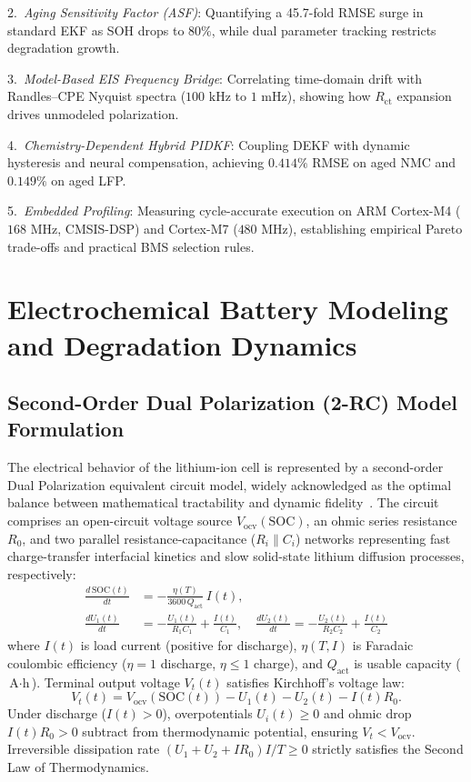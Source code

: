 \documentclass[preprint,12pt]{elsarticle}
\begin{document}
2.~\emph{Aging Sensitivity Factor (ASF)}: Quantifying a 45.7-fold RMSE surge in standard EKF as SOH drops to $80\%$, while dual parameter tracking restricts degradation growth.

3.~\emph{Model-Based EIS Frequency Bridge}: Correlating time-domain drift with Randles--CPE Nyquist spectra ($100\text{ kHz}$ to $1\text{ mHz}$), showing how $R_{\text{ct}}$ expansion drives unmodeled polarization.

4.~\emph{Chemistry-Dependent Hybrid PIDKF}: Coupling DEKF with dynamic hysteresis and neural compensation, achieving $0.414\%$ RMSE on aged NMC and $0.149\%$ on aged LFP.

5.~\emph{Embedded Profiling}: Measuring cycle-accurate execution on ARM Cortex-M4 ($168\text{ MHz}$, CMSIS-DSP) and Cortex-M7 ($480\text{ MHz}$), establishing empirical Pareto trade-offs and practical BMS selection rules.

\section{Electrochemical Battery Modeling and Degradation Dynamics}

\subsection{Second-Order Dual Polarization (2-RC) Model Formulation}
The electrical behavior of the lithium-ion cell is represented by a second-order Dual Polarization equivalent circuit model, widely acknowledged as the optimal balance between mathematical tractability and dynamic fidelity~\cite{Hu2012ecm,Xiong2014}. The circuit comprises an open-circuit voltage source $V_{\text{ocv}}(\text{SOC})$, an ohmic series resistance $R_0$, and two parallel resistance-capacitance ($R_i \parallel C_i$) networks representing fast charge-transfer interfacial kinetics and slow solid-state lithium diffusion processes, respectively:
\begin{align}
\frac{d\,\text{SOC}(t)}{dt} &= -\frac{\eta(T)}{3600\,Q_{\text{act}}}\,I(t), \label{eqn:soc_diff}\\
\frac{d U_1(t)}{dt} &= -\frac{U_1(t)}{R_1 C_1} + \frac{I(t)}{C_1}, \quad \frac{d U_2(t)}{dt} = -\frac{U_2(t)}{R_2 C_2} + \frac{I(t)}{C_2} \label{eqn:u12_diff}
\end{align}
where $I(t)$ is load current (positive for discharge), $\eta(T, I)$ is Faradaic coulombic efficiency ($\eta = 1$ discharge, $\eta \le 1$ charge), and $Q_{\text{act}}$ is usable capacity ($\text{A}\cdot\text{h}$). Terminal output voltage $V_t(t)$ satisfies Kirchhoff's voltage law:
\begin{equation}\label{eqn:vt_diff}
V_t(t) = V_{\text{ocv}}(\text{SOC}(t)) - U_1(t) - U_2(t) - I(t) R_0.
\end{equation}
Under discharge ($I(t) > 0$), overpotentials $U_i(t) \ge 0$ and ohmic drop $I(t) R_0 > 0$ subtract from thermodynamic potential, ensuring $V_t < V_{\text{ocv}}$. Irreversible dissipation rate $(U_1 + U_2 + I R_0) I / T \ge 0$ strictly satisfies the Second Law of Thermodynamics.
\end{document}
